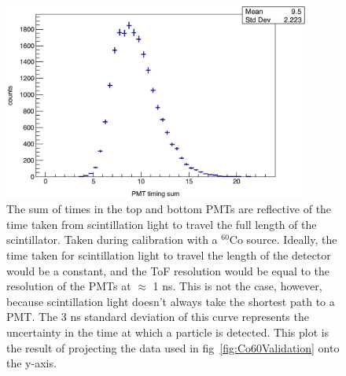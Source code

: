 \begin{figure}
    \centering
    \includegraphics[width = 0.9\textwidth]{Content/Methods/CO60ValidationProject.png}
    \caption{
    The sum of times in the top and bottom PMTs are reflective of the time taken from scintillation light to travel the full length of the scintillator.
    Taken during calibration with a $^{60}$Co source.
    Ideally, the time taken for scintillation light to travel the length of the detector would be a constant, and the ToF resolution would be equal to the resolution of the PMTs at $\approx$ 1 ns.
    This is not the case, however, because scintillation light doesn't always take the shortest path to a PMT.
    The 3 ns standard deviation of this curve represents the uncertainty in the time at which a particle is detected.
    This plot is the result of projecting the data used in fig~\ref{fig:Co60Validation} onto the y-axis.
}
    \label{fig:Co60ValidationProject}
\end{figure}

